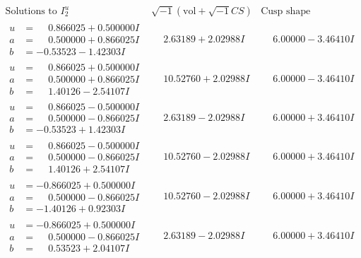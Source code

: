 \documentclass[1p]{elsarticle_modified}
\theoremstyle{definition}
\newcommand{\I}{\sqrt{-1}}
\begin{document}
$$\begin{array}{c|c|c}  
\text{Solutions to }I^u_{2}& \I (\text{vol} + \sqrt{-1}CS) & \text{Cusp shape}\\
 \hline 
\begin{aligned}
u &= \phantom{-}0.866025 + 0.500000 I \\
a &= \phantom{-}0.500000 + 0.866025 I \\
b &= -0.53523 - 1.42303 I\end{aligned}
 & \phantom{-}2.63189 + 2.02988 I & \phantom{-}6.00000 - 3.46410 I \\ \hline\begin{aligned}
u &= \phantom{-}0.866025 + 0.500000 I \\
a &= \phantom{-}0.500000 + 0.866025 I \\
b &= \phantom{-}1.40126 - 2.54107 I\end{aligned}
 & \phantom{-}10.52760 + 2.02988 I & \phantom{-}6.00000 - 3.46410 I \\ \hline\begin{aligned}
u &= \phantom{-}0.866025 - 0.500000 I \\
a &= \phantom{-}0.500000 - 0.866025 I \\
b &= -0.53523 + 1.42303 I\end{aligned}
 & \phantom{-}2.63189 - 2.02988 I & \phantom{-}6.00000 + 3.46410 I \\ \hline\begin{aligned}
u &= \phantom{-}0.866025 - 0.500000 I \\
a &= \phantom{-}0.500000 - 0.866025 I \\
b &= \phantom{-}1.40126 + 2.54107 I\end{aligned}
 & \phantom{-}10.52760 - 2.02988 I & \phantom{-}6.00000 + 3.46410 I \\ \hline\begin{aligned}
u &= -0.866025 + 0.500000 I \\
a &= \phantom{-}0.500000 - 0.866025 I \\
b &= -1.40126 + 0.92303 I\end{aligned}
 & \phantom{-}10.52760 - 2.02988 I & \phantom{-}6.00000 + 3.46410 I \\ \hline\begin{aligned}
u &= -0.866025 + 0.500000 I \\
a &= \phantom{-}0.500000 - 0.866025 I \\
b &= \phantom{-}0.53523 + 2.04107 I\end{aligned}
 & \phantom{-}2.63189 - 2.02988 I & \phantom{-}6.00000 + 3.46410 I \\ \hline\begin{aligned}

\end{aligned}
\end{array}$$
\end{document}
